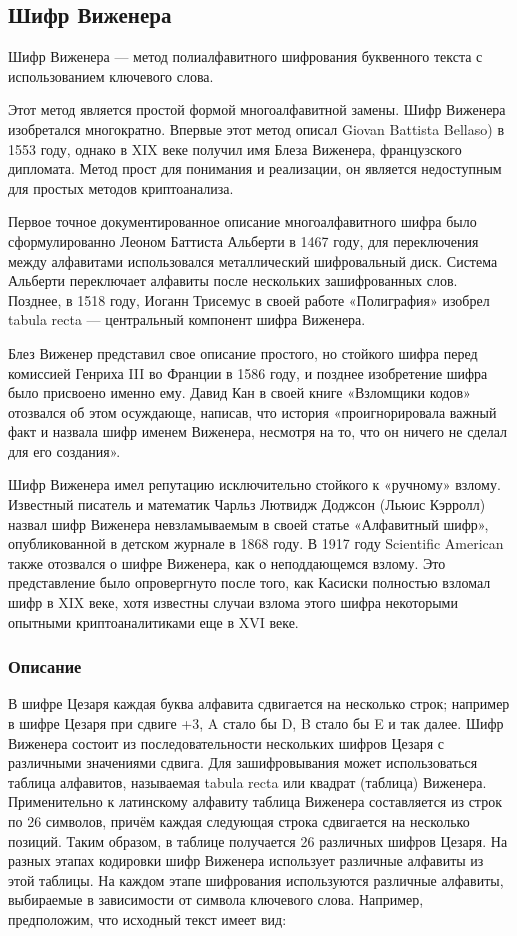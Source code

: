 \subsection{Шифр Виженера}

Шифр Виженера --- метод полиалфавитного 
шифрования буквенного текста с использованием ключевого слова.

Этот метод является простой формой многоалфавитной замены. Шифр 
Виженера изобретался многократно. Впервые этот метод описал
Giovan Battista Bellaso) в 1553 году, однако в XIX веке 
получил имя Блеза Виженера, французского дипломата. Метод прост 
для понимания и реализации, он является недоступным для простых 
методов криптоанализа.

Первое точное документированное описание многоалфавитного шифра 
было сформулированно Леоном Баттиста Альберти в 1467 году, для 
переключения между алфавитами использовался металлический шифровальный 
диск. Система Альберти переключает алфавиты после нескольких 
зашифрованных слов. Позднее, в 1518 году, Иоганн Трисемус в своей 
работе «Полиграфия» изобрел tabula recta — центральный компонент 
шифра Виженера.

Блез Виженер представил свое описание простого, но стойкого шифра 
перед комиссией Генриха III во Франции в 1586 году, и позднее 
изобретение шифра было присвоено именно ему. Давид Кан в своей 
книге «Взломщики кодов» отозвался об этом осуждающе, написав, 
что история «проигнорировала важный факт и назвала шифр именем 
Виженера, несмотря на то, что он ничего не сделал для его создания».

Шифр Виженера имел репутацию исключительно стойкого к «ручному»
взлому. Известный писатель и математик Чарльз Лютвидж Доджсон 
(Льюис Кэрролл) назвал шифр Виженера невзламываемым в своей статье 
«Алфавитный шифр», опубликованной в 
детском журнале в 1868 году. В 1917 году Scientific American 
также отозвался о шифре Виженера, как о неподдающемся взлому. 
Это представление было опровергнуто после того, как Касиски полностью 
взломал шифр в XIX веке, хотя известны случаи взлома этого шифра 
некоторыми опытными криптоаналитиками еще в XVI веке.

\subsubsection{Описание}

В шифре Цезаря каждая буква алфавита сдвигается на несколько 
строк; например в шифре Цезаря при сдвиге +3, A стало бы D, B 
стало бы E и так далее. Шифр Виженера состоит из последовательности 
нескольких шифров Цезаря с различными значениями сдвига. Для 
зашифровывания может использоваться таблица алфавитов, называемая 
tabula recta или квадрат (таблица) Виженера. Применительно к 
латинскому алфавиту таблица Виженера составляется из строк по 
26 символов, причём каждая следующая строка сдвигается на несколько 
позиций. Таким образом, в таблице получается 26 различных шифров 
Цезаря. На разных этапах кодировки шифр Виженера использует различные 
алфавиты из этой таблицы. На каждом этапе шифрования используются 
различные алфавиты, выбираемые в зависимости от символа ключевого 
слова. Например, предположим, что исходный текст имеет вид:

